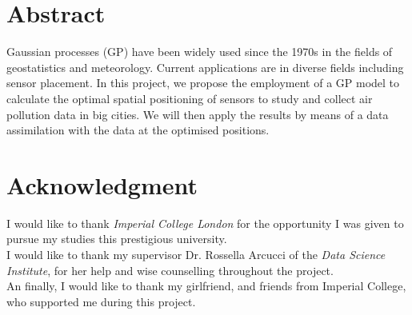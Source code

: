 \documentclass[12pt,twoside]{report}
\date{\today}
\begin{document}



\clearpage{\pagestyle{empty}\cleardoublepage}
\setcounter{page}{1}
\pagestyle{fancy}


\cleardoublepage

\clearpage{\pagestyle{empty}\cleardoublepage}

\chapter*{Abstract}

Gaussian processes (GP) have been widely used since the 1970s in the fields of geostatistics and meteorology. Current applications are in diverse fields including sensor placement.
In this project, we propose the employment of a GP model to calculate the optimal spatial positioning of sensors to study and collect air pollution data in big cities. We will then apply the results by means of a data assimilation with the data at the optimised positions.


\chapter*{Acknowledgment}

I would like to thank \textit{Imperial College London} for the opportunity I was given to pursue my studies this prestigious university. \\

I would like to thank my supervisor Dr. Rossella Arcucci  of the \textit{Data Science Institute}, for her help and wise counselling throughout the project. \\

An finally, I would like to thank my girlfriend, and friends from Imperial College, who supported me during this project. \\



\tableofcontents 
\end{document}
